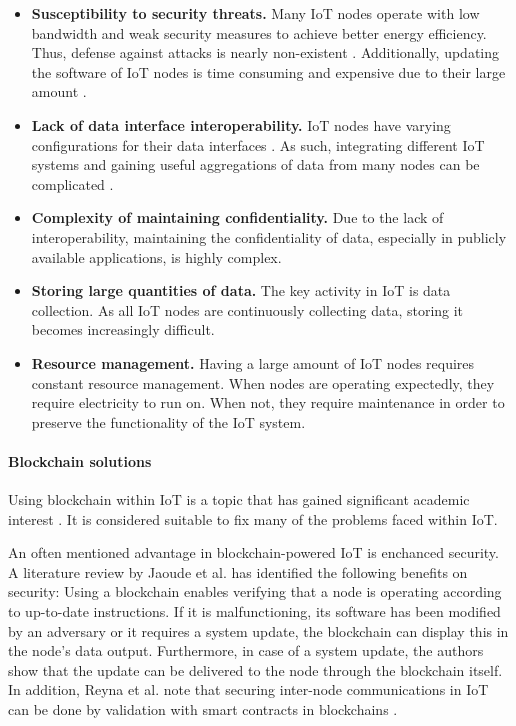 \begin{itemize}
  \item \textbf{Susceptibility to security threats.} Many IoT nodes
  operate with low bandwidth and weak security measures to achieve
  better energy efficiency. Thus, defense against attacks is
  nearly non-existent \cite{sisinniIndustrial}. Additionally, updating
  the software of IoT nodes is time consuming and expensive due to 
  their large amount \cite{jaoudeApplications}.

  \item \textbf{Lack of data interface interoperability.} IoT nodes
  have varying configurations for their data interfaces
  \cite{panInteroperability,viriyasitavatIot}. As such, integrating
  different IoT systems and gaining useful aggregations of data from
  many nodes can be complicated \cite{sisinniIndustrial}.

  \item \textbf{Complexity of maintaining confidentiality.} Due to the
  lack of interoperability, maintaining the confidentiality of data,
  especially in publicly available applications, is highly complex.

  \item \textbf{Storing large quantities of data.} The key activity in
  IoT is data collection. As all IoT nodes are continuously collecting
  data, storing it becomes increasingly difficult.

  \item \textbf{Resource management.} Having a large amount of IoT
  nodes requires constant resource management. When nodes are
  operating expectedly, they require electricity to run on. When not,
  they require maintenance in order to preserve the functionality of
  the IoT system.
\end{itemize}


\paragraph{Blockchain solutions} Using blockchain within IoT is a
topic that has gained significant academic interest
\cite{jaoudeApplications}. It is considered suitable to fix many of
the problems faced within IoT. 

An often mentioned advantage in blockchain-powered IoT is enchanced
security. A literature review by Jaoude et al.
\cite{jaoudeApplications} has identified the following benefits on
security: Using a blockchain enables verifying that a node is
operating according to up-to-date instructions. If it is
malfunctioning, its software has been modified by an adversary or it
requires a system update, the blockchain can display this in the
node's data output. Furthermore, in case of a system update, the
authors show that the update can be delivered to the node through the
blockchain itself. In addition, Reyna et al. note that securing
inter-node communications in IoT can be done by validation with
smart contracts in blockchains \cite{reynaIntegration}.

